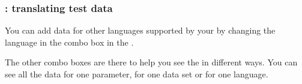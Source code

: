 \subsubsection{\gddatasetsview{}: translating test data}
\label{TasksDSVTranslate}

You can add data for other languages supported by your \gdaut{} by changing the language in the combo box in the \gddatasetsview{}. 


The other combo boxes are there to help you see the \gddatasetsview{} in different ways. You can see all the data for one parameter, for one data set or for one language. 


